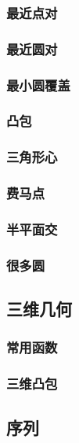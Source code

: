 \subsubsection{最近点对}

\subsubsection{最近圆对}

\subsubsection{最小圆覆盖}

\subsubsection{凸包}

\subsubsection{三角形心}

\subsubsection{费马点}

\subsubsection{半平面交}

\subsubsection{很多圆}




\subsection{三维几何}
\subsubsection{常用函数}

\subsubsection{三维凸包}


\subsection{序列}
